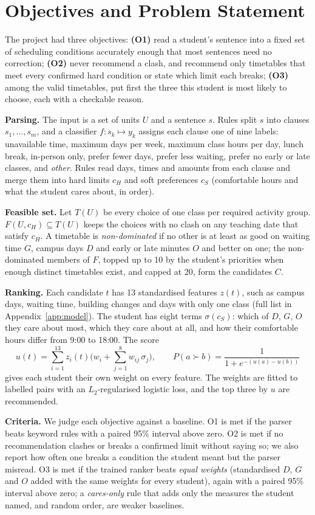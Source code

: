 \section{Objectives and Problem Statement}\label{sec:prob}

The project had three objectives: \textbf{(O1)} read a student's sentence into a fixed set of scheduling conditions accurately enough that most sentences need no correction; \textbf{(O2)} never recommend a clash, and recommend only timetables that meet every confirmed hard condition or state which limit each breaks; \textbf{(O3)} among the valid timetables, put first the three this student is most likely to choose, each with a checkable reason.

\textbf{Parsing.} The input is a set of units $U$ and a sentence $s$. Rules split $s$ into clauses $s_1,\dots,s_m$, and a classifier $f:s_k\mapsto y_k$ assigns each clause one of nine labels: unavailable time, maximum days per week, maximum class hours per day, lunch break, in-person only, prefer fewer days, prefer less waiting, prefer no early or late classes, and \emph{other}. Rules read days, times and amounts from each clause and merge them into hard limits $c_H$ and soft preferences $c_S$ (comfortable hours and what the student cares about, in order).

\textbf{Feasible set.} Let $T(U)$ be every choice of one class per required activity group. $F(U,c_H)\subseteq T(U)$ keeps the choices with no clash on any teaching date that satisfy $c_H$. A timetable is \emph{non-dominated} if no other is at least as good on waiting time $G$, campus days $D$ and early or late minutes $O$ and better on one; the non-dominated members of $F$, topped up to 10 by the student's priorities when enough distinct timetables exist, and capped at 20, form the candidates $C$.

\textbf{Ranking.} Each candidate $t$ has 13 standardised features $z(t)$, such as campus days, waiting time, building changes and days with only one class (full list in Appendix~\ref{app:model}). The student has eight terms $\sigma(c_S)$: which of $D$, $G$, $O$ they care about most, which they care about at all, and how their comfortable hours differ from 9:00 to 18:00. The score
\begin{equation}
	u(t) = \sum_{i=1}^{13} z_i(t)\Big(w_i + \sum_{j=1}^{8} w_{ij}\,\sigma_j\Big),
	\qquad
	P(a \succ b) = \frac{1}{1+e^{-(u(a)-u(b))}}
	\label{eq:utility}
\end{equation}
gives each student their own weight on every feature. The weights are fitted to labelled pairs with an $L_2$-regularised logistic loss, and the top three by $u$ are recommended.

\textbf{Criteria.} We judge each objective against a baseline. O1 is met if the parser beats keyword rules with a paired 95\% interval above zero. O2 is met if no recommendation clashes or breaks a confirmed limit without saying so; we also report how often one breaks a condition the student meant but the parser misread. O3 is met if the trained ranker beats \emph{equal weights} (standardised $D$, $G$ and $O$ added with the same weights for every student), again with a paired 95\% interval above zero; a \emph{cares-only} rule that adds only the measures the student named, and random order, are weaker baselines.

